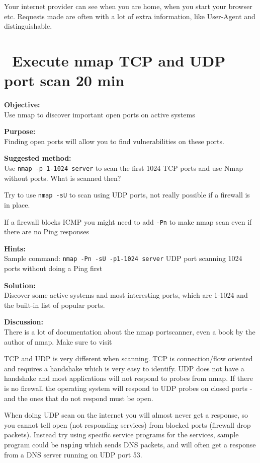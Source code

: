 \documentclass[a4paper,11pt,notitlepage]{report}
\begin{document}
Your internet provider can see when you are home, when you start your browser etc. Requests made are often with a lot of extra information, like User-Agent and distinguishable.




\chapter{\faExclamationTriangle\ Execute nmap TCP and UDP port scan 20 min}
\label{ex:nmap-synscan}


{\bf Objective:} \\
Use nmap to discover important open ports on active systems

{\bf Purpose:}\\
Finding open ports will allow you to find vulnerabilities on these ports.

{\bf Suggested method:}\\
Use \verb+nmap -p 1-1024 server+ to scan the first 1024 TCP
ports and use Nmap without ports. What is scanned then?

Try to use \verb+nmap -sU+ to scan using UDP ports, not really possible if a firewall is in place.

If a firewall blocks ICMP you might need to add \verb+-Pn+ to make nmap scan even if there are no Ping responses

{\bf Hints:} \\
Sample command: \verb+nmap -Pn -sU -p1-1024 server+ UDP port scanning
1024 ports without doing a Ping first

{\bf Solution:}\\
Discover some active systems and most interesting ports, which are 1-1024 and the built-in list of popular ports.

{\bf Discussion:}\\
There is a lot of documentation about the nmap portscanner, even a book by the author
of nmap. Make sure to visit 

TCP and UDP is very different when scanning. TCP is connection/flow oriented and requires a handshake which is very easy to identify. UDP does not have a handshake and most applications will not respond to probes from nmap. If there is no firewall the operating system will respond to UDP probes on closed ports - and the ones that do not respond must be open.

When doing UDP scan on the internet you will almost never get a response, so you cannot tell open (not responding services) from blocked ports (firewall drop packets). Instead try using specific service programs for the services, sample program could be \verb+nsping+ which sends DNS packets, and will often get a response from a DNS server running on UDP port 53.
\end{document}
